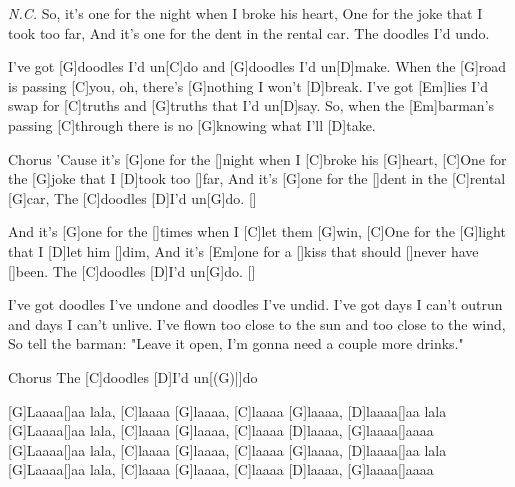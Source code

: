 


\begin{guitar}
	 {\footnotesize\textit{N.C.}}
	So, it's one for the night when I broke his heart,
	One for the joke that I took too far,
	And it's one for the dent in the rental car. 
	The doodles I'd undo.
	
	I've got [G]doodles I'd un[C]do and [G]doodles I'd un[D]make.
	When the [G]road is passing [C]you, oh, there's [G]nothing I won't [D]break.
	I've got [Em]lies I'd swap for [C]truths and [G]truths that I'd un[D]say.
	So, when the [Em]barman's passing [C]through there is no [G]knowing what I'll [D]take.
	
	\begin{chorus}{Chorus}
		'Cause it's [G]one for the []night when I [C]broke his [G]heart,
		[C]One for the [G]joke that I [D]took too []far,
		And it's [G]one for the []dent in the [C]rental [G]car,
		The [C]doodles [D]I'd un[G]do. []{}
		
		And it's [G]one for the []times when I [C]let them [G]win,
		[C]One for the [G]light that I [D]let him []dim,
		And it's [Em]one for a []kiss that should []never have []been. 
		The [C]doodles [D]I'd un[G]do. []{}%
	\end{chorus}
	
	I've got doodles I've undone and doodles I've undid.
	I've got days I can't outrun and days I can't unlive.
	I've flown too close to the sun and too close to the wind,
	So tell the barman: "Leave it open, I'm gonna need a couple more drinks."
	
	\begin{chorus}{Chorus} 
		The [C]doodles [D]I'd un[(G)|]{do} %
	\end{chorus}
	\pagebreak
	[G]Laaaa[]aa lala, [C]laaaa [G]laaaa, [C]laaaa [G]laaaa, [D]laaaa[]aa lala
	[G]Laaaa[]aa lala, [C]laaaa [G]laaaa, [C]laaaa [D]laaaa, [G]laaaa[]aaaa
	[G]Laaaa[]aa lala, [C]laaaa [G]laaaa, [C]laaaa [G]laaaa, [D]laaaa[]aa lala
	[G]Laaaa[]aa lala, [C]laaaa [G]laaaa, [C]laaaa [D]laaaa, [G]laaaa[]aaaa
	

\end{guitar}
